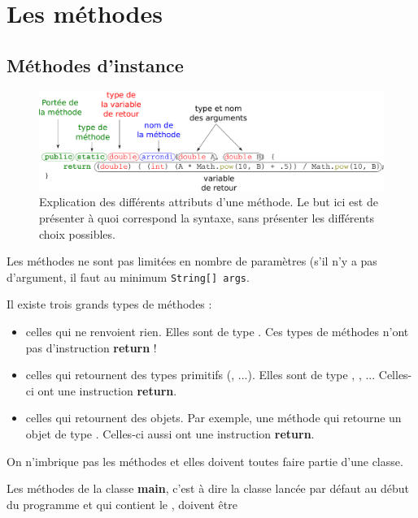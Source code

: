 \documentclass[a4paper,twoside]{article}
\begin{document}
\section{Les méthodes}
\subsection{Méthodes d'instance}

\begin{figure}[htb]
\centering
\includegraphics[width=\linewidth]{figures/method_scheme.pdf}
\caption{Explication des différents attributs d'une méthode. Le but ici est de présenter à quoi correspond la syntaxe, sans présenter les différents choix possibles.}
\end{figure}

Les méthodes ne sont pas limitées en nombre de paramètres (s'il n'y a pas d'argument, il faut au minimum \og \texttt{String[] args}\fg.

Il existe trois grands types de méthodes : 
\begin{itemize}
\item celles qui ne renvoient rien. Elles sont de type . Ces types de méthodes n'ont pas d'instruction \textbf{return} !
\item celles qui retournent des types primitifs (, ...). Elles sont de type , , ... Celles-ci ont une instruction \textbf{return}.
\item celles qui retournent des objets. Par exemple, une méthode qui retourne un objet de type . Celles-ci aussi ont une instruction \textbf{return}.
\end{itemize}

\bigskip

\begin{remarque}
On n'imbrique pas les méthodes et elles doivent toutes faire partie d'une classe. 
\end{remarque}

\begin{attention}
Les méthodes de la classe \textbf{main}, c'est à dire la classe lancée par défaut au début du programme et qui contient le , doivent être 
\end{attention}
\end{document}
